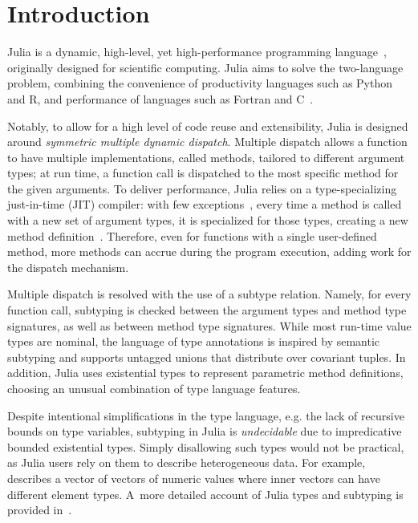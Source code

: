 \chapter{Introduction}

Julia is a dynamic, high-level, yet high-performance programming
language~\cite{TODO},
originally designed for scientific computing.
Julia aims to solve the two-language problem, combining the convenience of
productivity languages such as Python and R, and performance of languages such
as Fortran and C~\cite{TODO}.

Notably, to allow for a high level of code reuse and extensibility,
Julia is designed around \emph{symmetric multiple dynamic dispatch}.
Multiple dispatch allows a function to have multiple implementations, called
methods, tailored to different argument types; at run time, a function
call is dispatched to the most specific method for the given arguments.
To deliver performance, Julia relies on a type-specializing just-in-time (JIT)
compiler: with few exceptions~\cite{TODO},
every time a method is called with a new set of argument types,
it is specialized for those types, creating a new method definition~\cite{TODO}.
Therefore, even for functions with a single user-defined method,
more methods can accrue during the program execution,
adding work for the dispatch mechanism.


Multiple dispatch is resolved with the use of a subtype relation.
Namely, for every function call, subtyping is checked between
the argument types and method type signatures,
as well as between method type signatures.
While most run-time value types are nominal,
the language of type annotations is inspired by semantic subtyping
and supports untagged unions that distribute over covariant tuples.
In addition, Julia uses existential types
to represent parametric method definitions,
choosing an unusual combination of type language features.


Despite intentional simplifications in the type language,
e.g. the lack of recursive bounds on type variables,
subtyping in Julia is \emph{undecidable} due to %
impredicative bounded existential types.
Simply disallowing such types would not be practical,
as Julia users rely on them to describe heterogeneous data.
For example, 
describes a vector of vectors of numeric values where inner vectors
can have different element types.
A~more detailed account of Julia types and subtyping
is provided in~.

